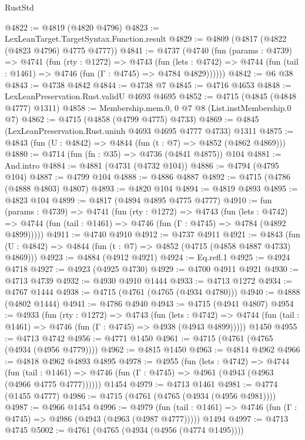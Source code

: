 \begin{lexlean}{RustStd}
\begin{coremodule}
@4822 := @4819 (@4820 @4796)
@4823 := LexLeanTarget.TargetSyntax.Function.result
@4829 := @4809 (@4817 (@4822 (@4823 @4796) @4775 @4777))
@4841 := @4737
    (@4740
      (fun (params : @4739) =>
      @4741
        (fun (rty : @1272) =>
        @4743
          (fun (lets : @4742) =>
          @4744 (fun (tail : @1461) => @4746 (fun (Γ : @4745) => @4784 @4829))))))
@4842 := @6 @38
@4843 := @4738 @4842
@4844 := @4738 @7
@4845 := @4716 @4653
@4848 := LexLeanPreservation.Rust.validU @4693 @4695
@4852 := @4715 (@4845 (@4848 @4777) @1311)
@4858 := Membership.mem.{0, 0} @7 @8 (List.instMembership.{0} @7)
@4862 := @4715 (@4858 (@4799 @4775) @4733)
@4869 := @4845 (LexLeanPreservation.Rust.uninh @4693 @4695 @4777 @4733) @1311
@4875 := @4843 (fun (U : @4842) => @4844 (fun (t : @7) => @4852 (@4862 @4869)))
@4880 := @4714 (fun (fn : @35) => @4736 (@4841 @4875)) @104
@4881 := And.intro
@4884 := @4881 (@4731 (@4732 @104))
@4886 := @4794 (@4795 @104)
@4887 := @4799 @104
@4888 := @4886 @4887
@4892 := @4715 (@4786 (@4888 @4803) @4807)
@4893 := @4820 @104
@4894 := @4819 @4893
@4895 := @4823 @104
@4899 := @4817 (@4894 @4895 @4775 @4777)
@4910 := fun (params : @4739) =>
  @4741
    (fun (rty : @1272) =>
    @4743
      (fun (lets : @4742) =>
      @4744 (fun (tail : @1461) => @4746 (fun (Γ : @4745) => @4784 (@4892 @4899)))))
@4911 := @4740 @4910
@4912 := @4737 @4911
@4921 := @4843 (fun (U : @4842) => @4844 (fun (t : @7) => @4852 (@4715 (@4858 @4887 @4733) @4869)))
@4923 := @4884 (@4912 @4921)
@4924 := Eq.refl.{1}
@4925 := @4924 @4718
@4927 := @4923 (@4925 @4730)
@4929 := @4700 @4911 @4921
@4930 := @4713 @4739
@4932 := @4930 @4910 @1444
@4933 := @4713 @1272
@4934 := @4767 @1444
@4938 := @4715 (@4761 (@4765 (@4934 @4780)))
@4940 := @4888 (@4802 @1444)
@4941 := @4786 @4940
@4943 := @4715 (@4941 @4807)
@4954 := @4933
    (fun (rty : @1272) =>
    @4743
      (fun (lets : @4742) =>
      @4744 (fun (tail : @1461) => @4746 (fun (Γ : @4745) => @4938 (@4943 @4899)))))
    @1450
@4955 := @4713 @4742
@4956 := @4771 @1450
@4961 := @4715 (@4761 (@4765 (@4934 (@4956 @4779))))
@4962 := @4815 @1450
@4963 := @4814 @4962
@4966 := @4818 @4962 @4893 @4895
@4978 := @4955
    (fun (lets : @4742) =>
    @4744
      (fun (tail : @1461) => @4746 (fun (Γ : @4745) => @4961 (@4943 (@4963 (@4966 @4775 @4777))))))
    @1454
@4979 := @4713 @1461
@4981 := @4774 (@1455 @4777)
@4986 := @4715 (@4761 (@4765 (@4934 (@4956 @4981))))
@4987 := @4966 @1454
@4996 := @4979
    (fun (tail : @1461) => @4746 (fun (Γ : @4745) => @4986 (@4943 (@4963 (@4987 @4777)))))
    @1494
@4997 := @4713 @4745
@5002 := @4761 (@4765 (@4934 (@4956 (@4774 @1495))))

\end{coremodule}
\end{lexlean}
